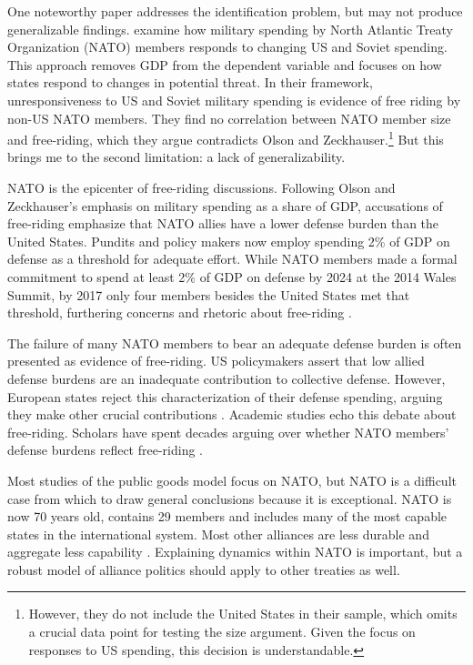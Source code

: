 \documentclass[12pt]{article}
\begin{document}
One noteworthy paper addresses the identification problem, but may not produce generalizable findings. 
\citet{PluemperNeumayer2015} examine how military spending by North Atlantic Treaty Organization (NATO) members responds to changing US and Soviet spending.
This approach removes GDP from the dependent variable and focuses on how states respond to changes in potential threat.  
In their framework, unresponsiveness to US and Soviet military spending is evidence of free riding by non-US NATO members.
They find no correlation between NATO member size and free-riding, which they argue contradicts Olson and Zeckhauser.\footnote{
However, they do not include the United States in their sample, which omits a crucial data point for testing the size argument. Given the focus on responses to US spending, this decision is understandable.}
But this brings me to the second limitation: a lack of generalizability. 


NATO is the epicenter of free-riding discussions. 
Following Olson and Zeckhauser's emphasis on military spending as a share of GDP, accusations of free-riding emphasize that NATO allies have a lower defense burden than the United States. 
Pundits and policy makers now employ spending 2\% of GDP on defense as a threshold for adequate effort.
While NATO members made a formal commitment to spend at least 2\% of GDP on defense by 2024 at the 2014 Wales Summit, by 2017 only four members besides the United States met that threshold, furthering concerns and rhetoric about free-riding \citep{EconomistNATO2017}. 


The failure of many NATO members to bear an adequate defense burden is often presented as evidence of free-riding. 
US policymakers assert that low allied defense burdens are an inadequate contribution to collective defense. 
However, European states reject this characterization of their defense spending, arguing they make other crucial contributions \citep{Boyer1993}. 
Academic studies echo this debate about free-riding.  
Scholars have spent decades arguing over whether NATO members' defense burdens reflect free-riding \citep{SandlerForbes1980, Palmer1990, GatesTerasawa1992, SandlerHartley2001, Lanoszka2015, PluemperNeumayer2015}.


Most studies of the public goods model focus on NATO, but NATO is a difficult case from which to draw general conclusions because it is exceptional. 
NATO is now 70 years old, contains 29 members and includes many of the most capable states in the international system. 
Most other alliances are less durable and aggregate less capability \citep{Leedsetal2002}. 
Explaining dynamics within NATO is important, but a robust model of alliance politics should apply to other treaties as well. 
\end{document}
